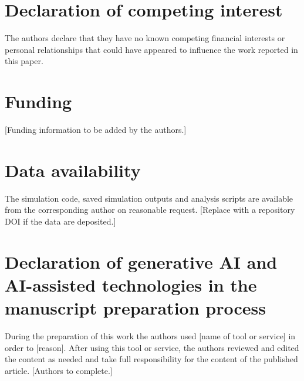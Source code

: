 \documentclass[a4paper,fleqn]{cas-sc}
\begin{document}
\section*{Declaration of competing interest}
The authors declare that they have no known competing financial interests or personal relationships that could have appeared to influence the work reported in this paper.

\section*{Funding}
[Funding information to be added by the authors.]

\section*{Data availability}
The simulation code, saved simulation outputs and analysis scripts are available from the corresponding author on reasonable request. [Replace with a repository DOI if the data are deposited.]

\section*{Declaration of generative AI and AI-assisted technologies in the manuscript preparation process}
During the preparation of this work the authors used [name of tool or service] in order to [reason]. After using this tool or service, the authors reviewed and edited the content as needed and take full responsibility for the content of the published article. [Authors to complete.]



\end{document}
